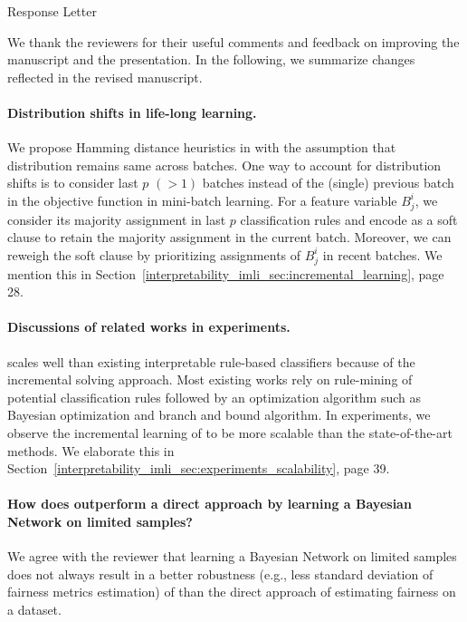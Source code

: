 \begin{center}
	\large
	Response Letter
\end{center}
We thank the reviewers for their useful comments and feedback on improving the manuscript and the presentation. In the following, we summarize changes reflected in the revised manuscript.


\paragraph{Distribution shifts in life-long learning.} We propose Hamming distance heuristics in {\imli} with the assumption that distribution remains same across batches. One way to account for distribution shifts is to consider last $ p $  $ (> 1) $ batches instead of the (single) previous batch in the objective function in mini-batch learning. For a feature variable $ B^i_j $, we consider its majority assignment in last $ p $ classification rules and encode as a soft clause to retain the majority assignment in the current batch. Moreover, we can reweigh the soft clause by prioritizing assignments of $ B^i_j $ in recent batches. We mention this in Section~\ref{interpretability_imli_sec:incremental_learning}, page 28.


\paragraph{Discussions of related works in experiments.}{\imli} scales well than existing interpretable rule-based classifiers because of the incremental solving approach. Most existing works rely on rule-mining of potential classification rules followed by an optimization algorithm such as Bayesian optimization and branch and bound algorithm. In experiments, we observe the incremental learning of {\imli} to be more scalable  than the state-of-the-art methods. We elaborate this in Section~\ref{interpretability_imli_sec:experiments_scalability}, page 39.


\paragraph{How does {\justicia} outperform a direct approach by learning a Bayesian Network on limited samples?} We agree with the reviewer that learning a Bayesian Network on limited samples does not always result in a better robustness (e.g., less standard deviation of fairness metrics estimation) of {\justicia} than the direct approach of estimating fairness on a dataset. 

